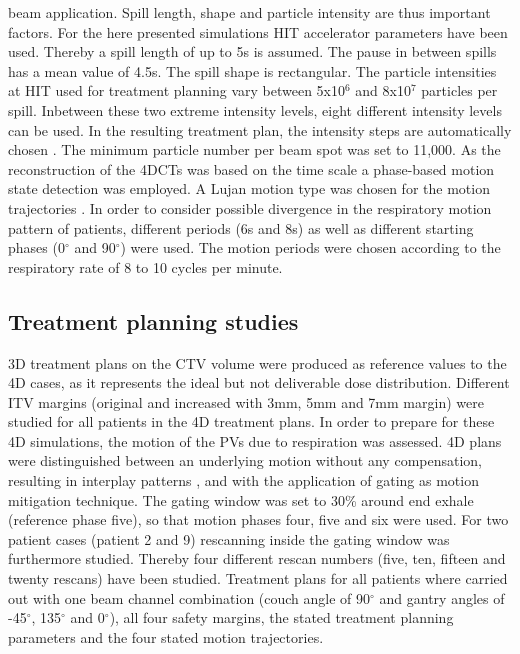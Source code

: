 \documentclass[type=dr, dr=rernat, accentcolor=tud7b,colorbacktitle, bigchapter, openright, twoside, 12pt ]{tudthesis}
\begin{document}
beam application. Spill length, shape and particle intensity are thus important factors. For the here presented simulations HIT accelerator 
parameters have been used. Thereby a spill length of up to 5s is assumed. The pause in between spills has a mean value of 4.5s. The spill 
shape is rectangular. The particle intensities at HIT used for treatment planning vary between 5x10$^{6}$ and 8x10$^{7}$ particles per spill. 
Inbetween these two extreme intensity levels, eight different intensity levels can be used. In the resulting treatment plan, the intensity 
steps are automatically chosen \cite{Ric13}. The minimum particle number per beam spot was set to 11,000.\newline
\newline
As the reconstruction of the 4DCTs was based on the time scale a phase-based motion state detection was employed. 
A Lujan motion type was chosen for the motion trajectories \cite{Luj99}. In order to consider possible divergence in the respiratory motion 
pattern of patients, different periods (6s and 8s) as well as different starting phases (0$^{\circ}$ and 90$^{\circ}$) were used. 
The motion periods were chosen according to the respiratory rate of 8 to 10 cycles per minute. 

\newpage

\subsection{Treatment planning studies}

3D treatment plans on the CTV volume were produced as reference values to the 4D cases, as it represents the ideal but not deliverable dose 
distribution. Different ITV margins (original and increased with 3mm, 5mm and 7mm margin) were studied for all patients in the 4D treatment plans. 
In order to prepare for these 4D simulations, the motion of the PVs due to respiration was assessed. 
4D plans were distinguished between an underlying motion without any compensation, resulting in interplay patterns \cite{Phi92} \cite{Ber08}, 
and with the application of gating \cite{Kub96} as motion mitigation technique. The gating window was set to 30\% around end exhale (reference 
phase five), so that motion phases four, five and six were used. For two patient cases (patient 2 and 9) rescanning inside the gating window 
was furthermore studied. Thereby four different rescan numbers (five, ten, fifteen and twenty rescans) have been studied. Treatment plans for 
all patients where carried out with one beam channel combination (couch angle of 90$^{\circ}$ and gantry angles of -45$^{\circ}$, 
135$^{\circ}$ and 0$^{\circ}$), all four safety margins, the stated treatment planning parameters and the four stated motion trajectories. 
\end{document}
